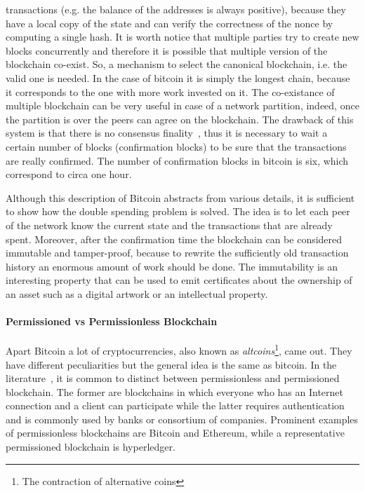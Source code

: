 transactions (e.g. the balance of the addresses is always positive), because 
they have a local copy of the state and can verify the correctness of the nonce 
by computing a single hash. It is worth notice that multiple parties try to 
create new blocks concurrently and therefore it is possible that multiple 
version of the blockchain co-exist. So, a mechanism to select the canonical 
blockchain, i.e. the valid one is needed. In the case of bitcoin it is simply 
the longest chain, because it corresponds to the one with more work invested on 
it. The co-existance of multiple blockchain can be very useful in case of a 
network partition, indeed, once the partition is over the peers can agree on 
the blockchain. The drawback of this system is that there is no consensus 
finality~\cite{bib:the-quest}, thus it is necessary to wait a certain number of 
blocks (confirmation blocks) to be sure that the transactions are really 
confirmed. The number of confirmation blocks in bitcoin is six, which 
correspond to circa one hour.

Although this description of Bitcoin abstracts from various details, it is
sufficient to show how the double spending problem is solved. The idea is to
let each peer of the network know the current state and the transactions that 
are already spent. Moreover, after the confirmation time the blockchain can be
considered immutable and tamper-proof, because to rewrite the sufficiently old
transaction history an enormous amount of work should be done. The immutability
is an interesting property that can be used to emit certificates about the
ownership of an asset such as a digital artwork or an intellectual property.

\paragraph{Permissioned vs Permissionless Blockchain}
Apart Bitcoin a lot of cryptocurrencies, also known as 
\emph{altcoins}\footnote{The contraction of alternative coins}, came out.
They have different peculiarities but the general idea is the same as bitcoin.
In the literature~\cite{bib:the-quest}, it is common to distinct between 
permissionless and permissioned blockchain. The former are blockchains in which 
everyone who has an Internet connection and a client can participate while the 
latter requires authentication and is commonly used by banks or consortium of 
companies. Prominent examples of permissionless blockchains are Bitcoin and 
Ethereum, while a representative permissioned blockchain is hyperledger.






